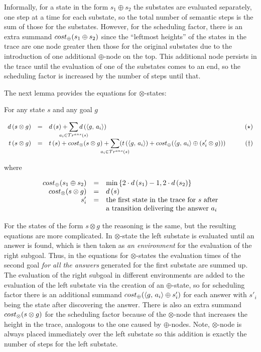 Informally, for a state in the form $s_1 \oplus s_2$ the substates are evaluated separately, one step at a time for
each substate, so the total number of semantic steps is the sum of those for the substates. However, for the scheduling factor, 
there is an extra summand $cost_{\oplus}(s_1 \oplus s_2)$ since the ``leftmost heights'' of the states in the trace are one node greater then those for the
original substates due to the introduction of one additional $\oplus$-node on the top. This additional node persists in the trace until the evaluation
of one of the substates comes to an end, so the scheduling factor is increased by the number of steps until that.

The next lemma provides the equations for $\otimes$-states:

\begin{lemma}
For any state $s$ and any goal $g$

\[
\begin{array}{rclr}
d\,(s \otimes g)  &=&  d\,(s) + \smashoperator[lr]{\sum\limits_{a_i \in \tra{s}}} d\,(\taskst{g}{a_i})& \qquad(\star) \\

 t\,(s \otimes g)  &=&  t\,(s) + \costconj{s}{g} + \smashoperator[lr]{\sum\limits_{a_i \in \tra{s}}} (t\,(\taskst{g}{a_i}) + \costdisj{\taskst{g}{a_i}}{(s'_i \otimes g)})&\qquad(\dagger)
\end{array}
\]

where 

\[
\begin{array}{rcl}
cost_{\oplus}(s_1 \oplus s_2) & = & \min\,\{2\cdot d\,(s_1) - 1, 2\cdot d\,(s_2)\} \\
cost_{\otimes}(s \otimes g) & = & d\,(s) \\
s'_i & = & \mbox{the first state in the trace for $s$ after} \\
 & & \mbox{a transition delivering the answer $a_i$} \\
\end{array}
\]
\end{lemma}

For the states of the form $s \otimes g$ the reasoning is the same, but the resulting equations are more complicated.
In $\otimes$-state the left substate is evaluated until an answer is found, which is then taken as
\emph{an environment} for the evaluation of the right subgoal.
Thus, in the equations for $\otimes$-states the evaluation times of the second goal \emph{for all
the answers} generated for the first substate are summed up. The evaluation of the right subgoal
in different environments are added to the evaluation of the left substate via the creation of
an $\oplus$-state, so for scheduling factor there is
an additional summand $cost_{\oplus}(\langle g ,\, a_i \rangle \oplus s'_i)$ for each answer with $s'_i$ being the state
after discovering the answer.
There is also an extra summand $cost_{\otimes}(s \otimes g)$ for the scheduling factor because of the
$\otimes$-node that increases the height in the trace, analogous to the one caused by
$\oplus$-nodes.
Note, $\otimes$-node is always placed immediately over the left substate so this
addition is exactly the number of steps for the left substate.

